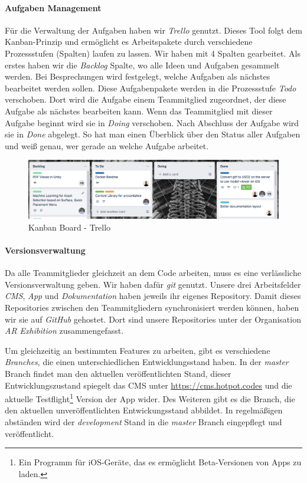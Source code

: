 \documentclass[titlepage, a4paper, 11pt]{scrartcl}
\begin{document}
    \paragraph{Aufgaben Management}
      Für die Verwaltung der Aufgaben haben wir \textit{Trello} genutzt.
      Dieses Tool folgt dem Kanban-Prinzip und ermöglicht es Arbeitspakete durch verschiedene Prozessstufen (Spalten) laufen zu lassen.
      Wir haben mit 4 Spalten gearbeitet. Als erstes haben wir die \textit{Backlog} Spalte, wo alle Ideen und Aufgaben gesammelt werden.
      Bei Besprechungen wird festgelegt, welche Aufgaben als nächstes bearbeitet werden sollen. Diese Aufgabenpakete werden in die Prozessstufe \textit{Todo} verschoben.
      Dort wird die Aufgabe einem Teammitglied zugeordnet, der diese Aufgabe als nächstes bearbeiten kann.
      Wenn das Teammitglied mit dieser Aufgabe beginnt wird sie in \textit{Doing} verschoben.
      Nach Abschluss der Aufgabe wird sie in \textit{Done} abgelegt.
      So hat man einen Überblick über den Status aller Aufgaben und weiß genau, wer gerade an welche Aufgabe arbeitet.
    
      \begin{figure}[h]
        \centering
        \includegraphics[width=.9\textwidth]{trello}
        \caption{Kanban Board - Trello}
        \label{Trello}
      \end{figure}
    

    \paragraph{Versionsverwaltung}
      Da alle Teammitglieder gleichzeit an dem Code arbeiten, muss es eine verlässliche Versionsverwaltung geben.
      Wir haben dafür \textit{git} genutzt. Unsere drei Arbeitsfelder \textit{CMS}, \textit{App} und \textit{Dokumentation} haben jeweils ihr eigenes Repository.
      Damit dieses Repositories zwischen den Teammitgliedern synchronisiert werden können, haben wir sie auf \textit{GitHub} gehostet.
      Dort sind unsere Repositories unter der Organisation \textit{AR Exhibition} zusammengefasst.

      Um gleichzeitig an bestimmten Features zu arbeiten, gibt es verschiedene \textit{Branches}, die einen unterschiedlichen Entwicklungsstand haben.
      In der \textit{master} Branch findet man den aktuellen veröffentlichten Stand, dieser Entwicklungszustand spiegelt das CMS unter \url{https://cms.hotpot.codes}
      und die aktuelle Testflight\footnote{Ein Programm für iOS-Geräte, das es ermöglicht Beta-Versionen von Apps zu laden.} Version der App wider.
      Des Weiteren gibt es die  Branch, die den aktuellen unveröffentlichten Entwickungsstand abbildet.
      In regelmäßigen abständen wird der \textit{development} Stand in die \textit{master} Branch eingepflegt und veröffentlicht.
\end{document}
